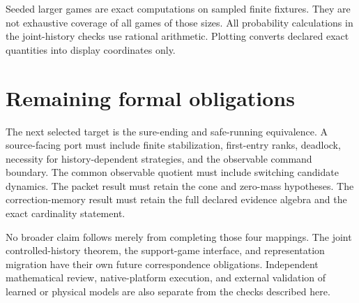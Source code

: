 Seeded larger games are exact computations on sampled finite fixtures. They are not exhaustive coverage of all games of those sizes. All probability calculations in the joint-history checks use rational arithmetic. Plotting converts declared exact quantities into display coordinates only.

\section*{Remaining formal obligations}
The next selected target is the sure-ending and safe-running equivalence. A source-facing port must include finite stabilization, first-entry ranks, deadlock, necessity for history-dependent strategies, and the observable command boundary. The common observable quotient must include switching candidate dynamics. The packet result must retain the cone and zero-mass hypotheses. The correction-memory result must retain the full declared evidence algebra and the exact cardinality statement.

No broader claim follows merely from completing those four mappings. The joint controlled-history theorem, the support-game interface, and representation migration have their own future correspondence obligations. Independent mathematical review, native-platform execution, and external validation of learned or physical models are also separate from the checks described here.
